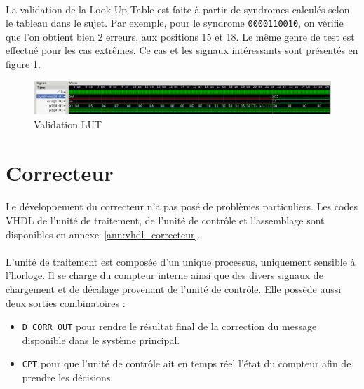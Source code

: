 \documentclass[a4paper, 11pt, svgnames]{report}
\begin{document}
            \paragraph{}
                La validation de la Look Up Table est faite à partir de
                syndromes calculés selon le tableau dans le sujet. Par exemple,
                pour le syndrome \verb|0000110010|, on vérifie que l'on obtient
                bien 2 erreurs, aux positions 15 et 18. Le même genre de test
                est effectué pour les cas extrêmes. Ce cas et les signaux
                intéressants sont présentés en figure \ref{fig:sim_lut}.

                \begin{figure}[H]
                    \centering
                    \includegraphics[width=\textwidth]{./images/lut_simu}
                    \caption{Validation LUT}
                    \label{fig:sim_lut}
                \end{figure}

        \section{Correcteur}
            \paragraph{}
                Le développement du correcteur n'a pas posé de problèmes
                particuliers. Les codes VHDL de l'unité de traitement, de 
                l'unité de contrôle et l'assemblage sont disponibles en 
                annexe~\ref{ann:vhdl_correcteur}.
            
            \paragraph{}
                L'unité de traitement est composée d'un unique processus,
                uniquement sensible à l'horloge. Il se charge du compteur
                interne ainsi que des divers signaux de chargement et de
                décalage provenant de l'unité de contrôle.
                Elle possède aussi deux sorties combinatoires :     
                 \begin{itemize}
                    \item \verb|D_CORR_OUT| pour rendre le résultat final de la 
                        correction du message disponible dans le système principal.
                    \item \verb|CPT| pour que l'unité de contrôle ait en temps
                        réel l'état du compteur afin de prendre les décisions.
                \end{itemize}
\end{document}
